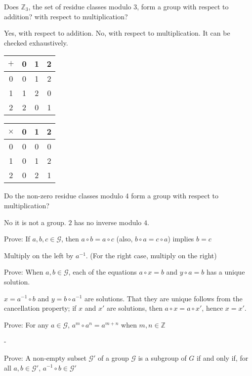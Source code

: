 \exercises

\exercise 
Does $\mathbb{Z}_3$, the set of residue classes modulo $3$, form a group with respect to addition? with respect to multiplication?

\answer
Yes, with respect to addition. No, with respect to multiplication. It can be checked exhaustively.

\begin{center}
    \begin{tabular} { c|c c c }
        $+$ & 0 & 1 & 2 \\\hline
        0 & 0 & 1 & 2 \\
        1 & 1 & 2 & 0 \\
        2 & 2 & 0 & 1 \\
    \end{tabular}
    \begin{tabular} { c|c c c }
        $\times$ & 0 & 1 & 2 \\\hline
        0 & 0 & 0 & 0 \\
        1 & 0 & 1 & 2 \\
        2 & 0 & 2 & 1 \\
    \end{tabular}
\end{center}


\exercise
Do the non-zero residue classes modulo 4 form a group with respect to multiplication?

\answer
No it is not a group. $2$ has no inverse modulo $4$.


\exercise
Prove: If $a, b, c \in \mathcal{G}$, then $a \circ b = a \circ c$ (also, $b \circ a = c \circ a$) implies $b = c$

\answer
Multiply on the left by $a^{-1}$. (For the right case, multiply on the right)


\exercise
Prove: When $a, b \in \mathcal{G}$, each of the equations $a \circ x = b$ and $y \circ a = b$ has a unique solution.

\answer
$x = a^{-1} \circ b$ and $y = b \circ a^{-1}$ are solutions. That they are unique follows from the cancellation property; if $x$ and $x'$ are solutions, then $a \circ x = a \circ x'$, hence $x = x'$.


\exercise
Prove: For any $a \in \mathcal{G}$, $a^m \circ a^n = a^{m+n}$ when $m, n \in \mathbb{Z}$

\answer
-


\exercise
Prove: A non-empty subset $\mathcal{G}'$ of a group $\mathcal{G}$ is a subgroup of $G$ if and only if, for all $a,b \in \mathcal{G}'$, $a^{-1} \circ b \in \mathcal{G}'$


